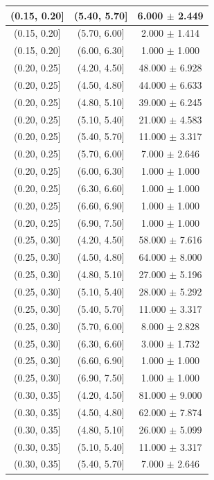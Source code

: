\begin{longtable}{|c|c|c|}
(0.15, 0.20] & (5.40, 5.70] & 6.000 $\pm$ 2.449 \\ 
\hline
(0.15, 0.20] & (5.70, 6.00] & 2.000 $\pm$ 1.414 \\ 
\hline
(0.15, 0.20] & (6.00, 6.30] & 1.000 $\pm$ 1.000 \\ 
\hline
(0.20, 0.25] & (4.20, 4.50] & 48.000 $\pm$ 6.928 \\ 
\hline
(0.20, 0.25] & (4.50, 4.80] & 44.000 $\pm$ 6.633 \\ 
\hline
(0.20, 0.25] & (4.80, 5.10] & 39.000 $\pm$ 6.245 \\ 
\hline
(0.20, 0.25] & (5.10, 5.40] & 21.000 $\pm$ 4.583 \\ 
\hline
(0.20, 0.25] & (5.40, 5.70] & 11.000 $\pm$ 3.317 \\ 
\hline
(0.20, 0.25] & (5.70, 6.00] & 7.000 $\pm$ 2.646 \\ 
\hline
(0.20, 0.25] & (6.00, 6.30] & 1.000 $\pm$ 1.000 \\ 
\hline
(0.20, 0.25] & (6.30, 6.60] & 1.000 $\pm$ 1.000 \\ 
\hline
(0.20, 0.25] & (6.60, 6.90] & 1.000 $\pm$ 1.000 \\ 
\hline
(0.20, 0.25] & (6.90, 7.50] & 1.000 $\pm$ 1.000 \\ 
\hline
(0.25, 0.30] & (4.20, 4.50] & 58.000 $\pm$ 7.616 \\ 
\hline
(0.25, 0.30] & (4.50, 4.80] & 64.000 $\pm$ 8.000 \\ 
\hline
(0.25, 0.30] & (4.80, 5.10] & 27.000 $\pm$ 5.196 \\ 
\hline
(0.25, 0.30] & (5.10, 5.40] & 28.000 $\pm$ 5.292 \\ 
\hline
(0.25, 0.30] & (5.40, 5.70] & 11.000 $\pm$ 3.317 \\ 
\hline
(0.25, 0.30] & (5.70, 6.00] & 8.000 $\pm$ 2.828 \\ 
\hline
(0.25, 0.30] & (6.30, 6.60] & 3.000 $\pm$ 1.732 \\ 
\hline
(0.25, 0.30] & (6.60, 6.90] & 1.000 $\pm$ 1.000 \\ 
\hline
(0.25, 0.30] & (6.90, 7.50] & 1.000 $\pm$ 1.000 \\ 
\hline
(0.30, 0.35] & (4.20, 4.50] & 81.000 $\pm$ 9.000 \\ 
\hline
(0.30, 0.35] & (4.50, 4.80] & 62.000 $\pm$ 7.874 \\ 
\hline
(0.30, 0.35] & (4.80, 5.10] & 26.000 $\pm$ 5.099 \\ 
\hline
(0.30, 0.35] & (5.10, 5.40] & 11.000 $\pm$ 3.317 \\ 
\hline
(0.30, 0.35] & (5.40, 5.70] & 7.000 $\pm$ 2.646 \\ 

\end{longtable}
